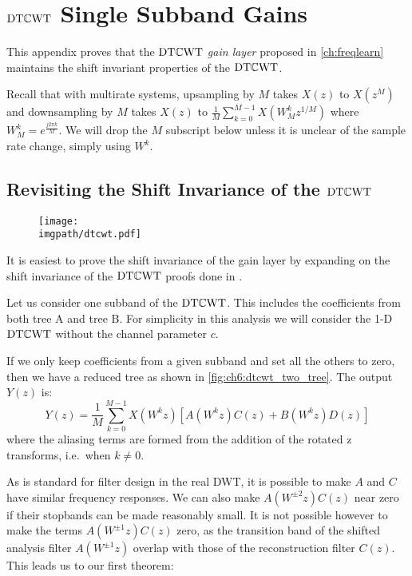 \chapter{$\mathrm{DT}\mathbb{C}\mathrm{WT}$ Single Subband Gains}\label{app:ch6:dtcwt}
\def \path {freqlearn/}
\def \imgpath {freqlearn/images}
This appendix proves that the $\mathrm{DT}\mathbb{C}\mathrm{WT}$ \emph{gain layer} proposed in
\autoref{ch:freqlearn} maintains the shift invariant properties of the
$\mathrm{DT}\mathbb{C}\mathrm{WT}$.

Recall that with multirate systems, upsampling by $M$ takes $X(z)$ to
$X(z^M)$ and downsampling by $M$ takes $X(z)$ to $\frac{1}{M}\sum_{k=0}^{M-1} X(W_M^k
z^{1/M})$ where $W_M^k = e^{\frac{j2\pi k}{M}}$. We will drop the $M$ subscript
below unless it is unclear of the sample rate change, simply using $W^k$.


\section{Revisiting the Shift Invariance of the $\mathrm{DT}\mathbb{C}\mathrm{WT}$}
\begin{figure}[t]
  \centering
  \texttt{[image: \\imgpath/dtcwt.pdf]}
  \label{fig:ch6:dtcwt_two_tree}
\end{figure}
It is easiest to prove the shift invariance of the gain layer by expanding on
the shift invariance of the $\mathrm{DT}\mathbb{C}\mathrm{WT}$ proofs done in
\cite{kingsbury_complex_2001}.

Let us consider one subband of the $\mathrm{DT}\mathbb{C}\mathrm{WT}$. This includes the coefficients from
both tree A and tree B. For simplicity in this analysis we will consider the 1-D
$\mathrm{DT}\mathbb{C}\mathrm{WT}$ without the channel parameter $c$. 

If we only keep coefficients from a given
subband and set all the others to zero, then we have a reduced tree as shown in
\autoref{fig:ch6:dtcwt_two_tree}. The output $Y(z)$ is:
%
\begin{equation}
  Y(z) = \frac{1}{M} \sum_{k=0}^{M-1}X(W^k z) \left[A(W^k z)C(z) + B(W^k z)D(z)\right]
  \label{eq:ch6:aliasing}
\end{equation}
%
where the aliasing terms are formed from the addition of the rotated z
transforms, i.e.\ when $k \neq 0$.

As is standard for filter design in the real DWT, it is possible to make $A$ and $C$ have
similar frequency responses. We can also make $A(W^{\pm 2}z) C(z)$ near zero if
their stopbands can be made reasonably small. It is not possible however to make
the terms $A(W^{\pm 1}z)C(z)$ zero, as the transition band of the shifted
analysis filter $A(W^{\pm 1}z)$ overlap with those of the reconstruction filter
$C(z)$. This leads us to our first theorem:

